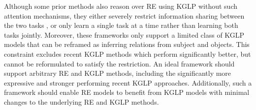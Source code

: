 Although some prior methods also reason over RE using KGLP without such attention mechanisms, they either severely restrict information sharing between the two tasks \citep[e.g.,][]{weston-2013}, or only learn a single task at a time \citep[e.g.,][]{lfds,weston-2013} rather than learning both tasks jointly.
Moreover, these frameworks only support a limited class of KGLP models that can be reframed as inferring relations from subject and objects.
This constraint excludes recent KGLP methods which perform significantly better, but cannot be reformulated to satisfy the restriction.
An ideal framework should support arbitrary RE and KGLP methods, including the significantly more expressive and stronger performing recent KGLP approaches.
Additionally, such a framework should enable RE models to benefit from KGLP models with minimal changes to the underlying RE and KGLP methods.

